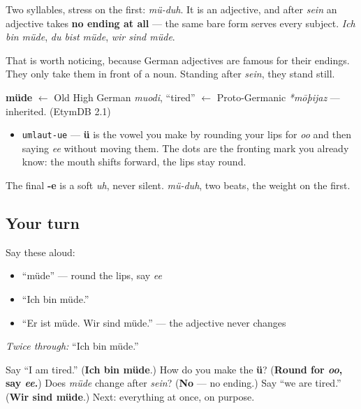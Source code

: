 Two syllables, stress on the first: \emph{mü-duh}. It is an adjective, and after \emph{sein} an adjective takes \textbf{no ending at all} — the same bare form serves every subject. \emph{Ich bin müde}, \emph{du bist müde}, \emph{wir sind müde}.

That is worth noticing, because German adjectives are famous for their endings. They only take them in front of a noun. Standing after \emph{sein}, they stand still.

\begin{cousinweb}
\textbf{müde} $\leftarrow$ Old High German \emph{muodi}, \textquotedblleft{}tired\textquotedblright{} $\leftarrow$ Proto-Germanic \emph{*mōþijaz} — inherited. (EtymDB 2.1)
\end{cousinweb}

\begin{sounds}
\begin{itemize}
\raggedright
  \item \texttt{umlaut-ue} — \textbf{ü} is the vowel you make by rounding your lips for \emph{oo} and then saying \emph{ee} without moving them. The dots are the fronting mark you already know: the mouth shifts forward, the lips stay round.
\end{itemize}

The final \textbf{-e} is a soft \emph{uh}, never silent. \emph{mü-duh}, two beats, the weight on the first.
\end{sounds}

\subsection*{Your turn}
Say these aloud:

\begin{itemize}
\raggedright
  \item \textquotedblleft{}müde\textquotedblright{} — round the lips, say \emph{ee}
  \item \textquotedblleft{}Ich bin müde.\textquotedblright{}
  \item \textquotedblleft{}Er ist müde. Wir sind müde.\textquotedblright{} — the adjective never changes
\end{itemize}

\emph{Twice through:} \textquotedblleft{}Ich bin müde.\textquotedblright{}

\begin{tcolorbox}[breakable,colback=teal!4,colframe=teal!35!black,title={Before you move on}]
Say \textquotedblleft{}I am tired.\textquotedblright{} (\textbf{Ich bin müde}.) How do you make the \textbf{ü}? (\textbf{Round for \emph{oo}, say \emph{ee}.}) Does \emph{müde} change after \emph{sein}? (\textbf{No} — no ending.) Say \textquotedblleft{}we are tired.\textquotedblright{} (\textbf{Wir sind müde}.) Next: everything at once, on purpose.
\end{tcolorbox}
